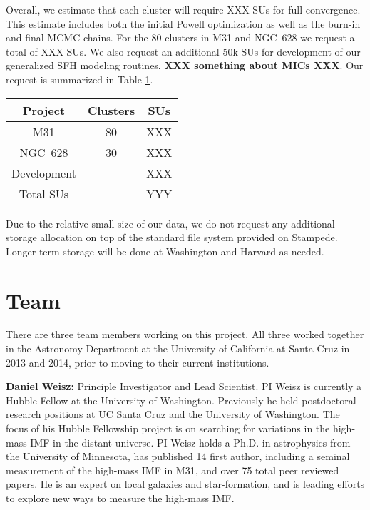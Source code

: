 \documentclass[11pt,preprint]{aastex}
\begin{document}
Overall, we estimate that each cluster will require XXX SUs for full convergence.  This estimate includes both the initial Powell optimization as well as the burn-in and final MCMC chains.  For the 80 clusters in M31 and NGC~628 we request a total of XXX SUs.  We also request an additional 50k SUs for development of our generalized SFH modeling routines.  \textbf{XXX something about MICs XXX}.  Our request is summarized in Table \ref{tab1}.

\begin{table}[h!]
\begin{center}
\begin{tabular}{cc|c}
Project & Clusters & SUs \\
\hline
M31 & 80 & XXX \\
NGC~628 & 30 & XXX \\
Development & & XXX \\
\hline Total SUs & & YYY \\
\hline

\end{tabular}
\end{center}
\label{tab1}
\end{table}%


Due to the relative small size of our data, we do not request any additional storage allocation on top of the standard file system provided on Stampede.  Longer term storage will be done at Washington and Harvard as needed.








\section{Team}

There are three team members working on this project.  All three worked together in the Astronomy Department at the University of California at Santa Cruz in 2013 and 2014, prior to moving to their current institutions.

\textbf{Daniel Weisz:}  Principle Investigator and Lead Scientist.  PI Weisz is currently a Hubble Fellow at the University of Washington.  Previously he held postdoctoral research positions at UC Santa Cruz and the University of Washington.  The focus of his Hubble Fellowship project is on searching for variations in the high-mass IMF in the distant universe.  PI Weisz holds a Ph.D. in astrophysics from the University of Minnesota, has published 14 first author, including a seminal measurement of the high-mass IMF in M31, and over 75 total peer reviewed papers. He is an expert on local galaxies and star-formation, and is leading efforts to explore new ways to measure the high-mass IMF.  \\
\end{document}
